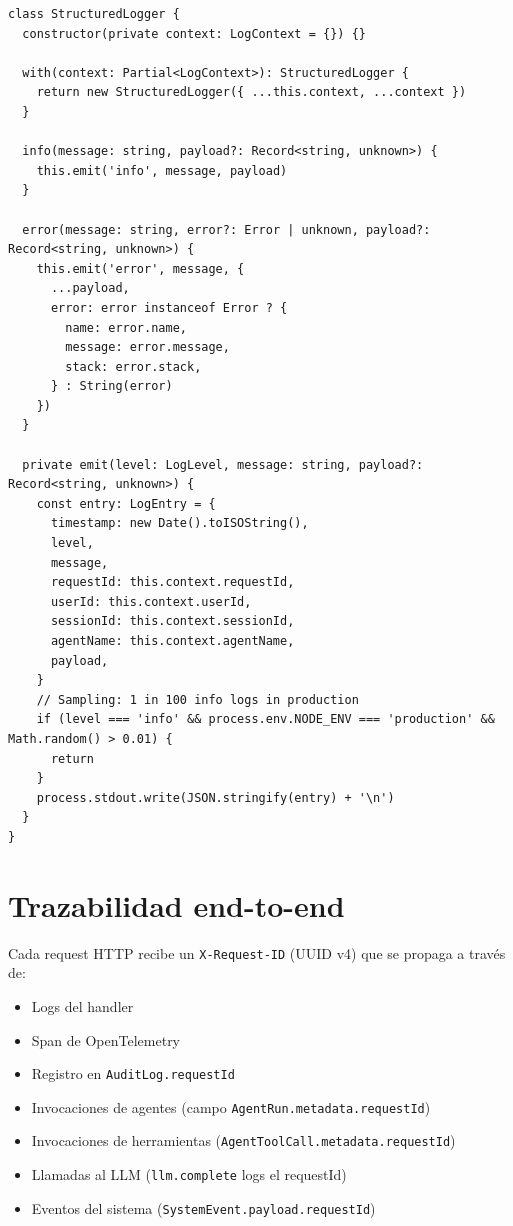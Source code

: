 \documentclass[10pt,a4paper,oneside]{report}
\begin{document}
\begin{lstlisting}[style=ts,caption={Logger estructurado}]
class StructuredLogger {
  constructor(private context: LogContext = {}) {}

  with(context: Partial<LogContext>): StructuredLogger {
    return new StructuredLogger({ ...this.context, ...context })
  }

  info(message: string, payload?: Record<string, unknown>) {
    this.emit('info', message, payload)
  }

  error(message: string, error?: Error | unknown, payload?: Record<string, unknown>) {
    this.emit('error', message, {
      ...payload,
      error: error instanceof Error ? {
        name: error.name,
        message: error.message,
        stack: error.stack,
      } : String(error)
    })
  }

  private emit(level: LogLevel, message: string, payload?: Record<string, unknown>) {
    const entry: LogEntry = {
      timestamp: new Date().toISOString(),
      level,
      message,
      requestId: this.context.requestId,
      userId: this.context.userId,
      sessionId: this.context.sessionId,
      agentName: this.context.agentName,
      payload,
    }
    // Sampling: 1 in 100 info logs in production
    if (level === 'info' && process.env.NODE_ENV === 'production' && Math.random() > 0.01) {
      return
    }
    process.stdout.write(JSON.stringify(entry) + '\n')
  }
}
\end{lstlisting}

\section{Trazabilidad end-to-end}
Cada request HTTP recibe un \texttt{X-Request-ID} (UUID v4) que se propaga a través de:

\begin{itemize}[leftmargin=1.4em]
\item Logs del handler
\item Span de OpenTelemetry
\item Registro en \texttt{AuditLog.requestId}
\item Invocaciones de agentes (campo \texttt{AgentRun.metadata.requestId})
\item Invocaciones de herramientas (\texttt{AgentToolCall.metadata.requestId})
\item Llamadas al LLM (\texttt{llm.complete} logs el requestId)
\item Eventos del sistema (\texttt{SystemEvent.payload.requestId})
\end{itemize}
\end{document}
